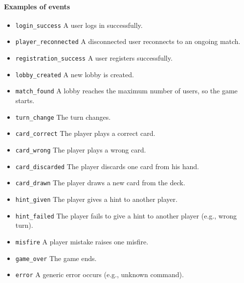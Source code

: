 \documentclass{scrartcl}
\begin{document}
  \paragraph{Examples of events}
  \begin{itemize}
      \item \texttt{login\_success} \newline A user logs in successfully.
      \item \texttt{player\_reconnected} \newline A disconnected user reconnects to an ongoing match.
      \item \texttt{registration\_success} \newline A user registers successfully.
      \item \texttt{lobby\_created} \newline A new lobby is created.
      \item \texttt{match\_found} \newline A lobby reaches the maximum number of users, so the game starts.
      \item \texttt{turn\_change} \newline The turn changes.
      \item \texttt{card\_correct} \newline The player plays a correct card.
      \item \texttt{card\_wrong} \newline The player plays a wrong card.
      \item \texttt{card\_discarded} \newline The player discards one card from his hand.
      \item \texttt{card\_drawn} \newline The player draws a new card from the deck.
      \item \texttt{hint\_given} \newline The player gives a hint to another player.
      \item \texttt{hint\_failed} \newline The player fails to give a hint to another player (e.g., wrong turn).
      \item \texttt{misfire} \newline A player mistake raises one misfire.
      \item \texttt{game\_over} \newline The game ends.
      \item \texttt{error} \newline A generic error occurs (e.g., unknown command).
  \end{itemize}
\end{document}

